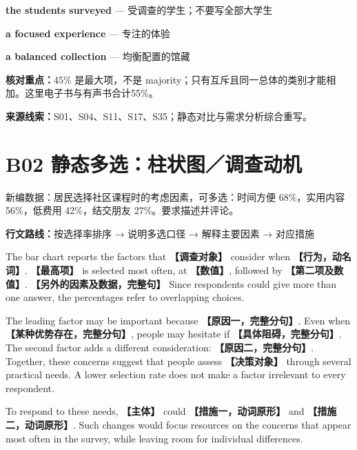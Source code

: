 \documentclass[11pt,a4paper,fontset=macnew]{ctexart}
\newenvironment{writing}{\begingroup\fontsize{10.5}{13.5}\selectfont\setlength{\parskip}{3pt}}{\par\endgroup}
\begin{document}
\par\vspace{4pt}{\bfseries 好词好句：优先记这三处}\par\nopagebreak
{\small\textbf{the students surveyed} — 受调查的学生；不要写全部大学生}\par
{\small\textbf{a focused experience} — 专注的体验}\par
{\small\textbf{a balanced collection} — 均衡配置的馆藏}\par
{\small\textbf{核对重点：}45\% 是最大项，不是 majority；只有互斥且同一总体的类别才能相加。这里电子书与有声书合计55\%。}\par
{\fontsize{8}{10}\selectfont\textbf{来源线索：}S01、S04、S11、S17、S35；静态对比与需求分析综合重写。}\par
\clearpage\section*{B02  静态多选：柱状图／调查动机}
{\small 新编数据：居民选择社区课程时的考虑因素，可多选：时间方便 68\%，实用内容 56\%，低费用 42\%，结交朋友 27\%。要求描述并评论。}\par
{\small\textbf{行文路线：}按选择率排序 → 说明多选口径 → 解释主要因素 → 对应措施}\par
\par\vspace{4pt}{\bfseries 可替换模板}\par\nopagebreak
\begin{writing}
The bar chart reports the factors that {\bfseries 【调查对象】} consider when {\bfseries 【行为，动名词】}. {\bfseries 【最高项】} is selected most often, at {\bfseries 【数值】}, followed by {\bfseries 【第二项及数值】}. {\bfseries 【另外的因素及数据，完整句】} Since respondents could give more than one answer, the percentages refer to overlapping choices.

The leading factor may be important because {\bfseries 【原因一，完整分句】}. Even when {\bfseries 【某种优势存在，完整分句】}, people may hesitate if {\bfseries 【具体阻碍，完整分句】}. The second factor adds a different consideration: {\bfseries 【原因二，完整分句】}. Together, these concerns suggest that people assess {\bfseries 【决策对象】} through several practical needs. A lower selection rate does not make a factor irrelevant to every respondent.

To respond to these needs, {\bfseries 【主体】} could {\bfseries 【措施一，动词原形】} and {\bfseries 【措施二，动词原形】}. Such changes would focus resources on the concerns that appear most often in the survey, while leaving room for individual differences.

\end{writing}
\end{document}
